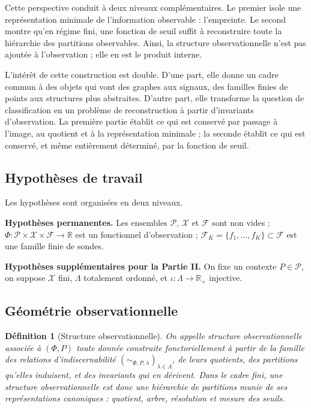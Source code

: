 \documentclass[11pt,a4paper]{article}
\newtheorem{definition}{Définition}
\begin{document}
Cette perspective conduit à deux niveaux complémentaires. Le premier isole une représentation minimale de l'information observable : l'empreinte. Le second montre qu'en régime fini, une fonction de seuil suffit à reconstruire toute la hiérarchie des partitions observables. Ainsi, la structure observationnelle n'est pas ajoutée à l'observation ; elle en est le produit interne.

L'intérêt de cette construction est double. D'une part, elle donne un cadre commun à des objets qui vont des graphes aux signaux, des familles finies de points aux structures plus abstraites. D'autre part, elle transforme la question de classification en un problème de reconstruction à partir d'invariants d'observation. La première partie établit ce qui est conservé par passage à l'image, au quotient et à la représentation minimale ; la seconde établit ce qui est conservé, et même entièrement déterminé, par la fonction de seuil.

\subsection{Hypothèses de travail}

Les hypothèses sont organisées en deux niveaux.

\medskip
\noindent\textbf{Hypothèses permanentes.}
Les ensembles \(\mathcal P\), \(\mathcal X\) et \(\mathcal F\) sont non vides ; \(\Phi:\mathcal P\times\mathcal X\times\mathcal F\to\mathbb R\) est un fonctionnel d'observation ; \(\mathcal F_K=\{f_1,\ldots,f_K\}\subset\mathcal F\) est une famille finie de sondes.

\medskip
\noindent\textbf{Hypothèses supplémentaires pour la Partie II.}
On fixe un contexte \(P\in\mathcal P\), on suppose \(\mathcal X\) fini, \(\Lambda\) totalement ordonné, et \(\iota:\Lambda\to\mathbb R_+\) injective.

\subsection{Géométrie observationnelle}

\begin{definition}[Structure observationnelle]
On appelle \emph{structure observationnelle} associée à \((\Phi,P)\) toute donnée construite fonctoriellement à partir de la famille des relations d'indiscernabilité \((\sim_{\Phi,P,\lambda})_{\lambda\in\Lambda}\), de leurs quotients, des partitions qu'elles induisent, et des invariants qui en dérivent. Dans le cadre fini, une structure observationnelle est donc une hiérarchie de partitions munie de ses représentations canoniques : quotient, arbre, résolution et mesure des seuils.
\end{definition}
\end{document}
